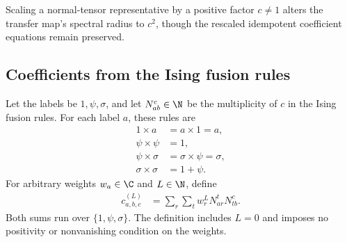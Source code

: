 Scaling a normal-tensor representative by a positive factor $c \ne 1$
alters the transfer map's spectral radius to $c^2$, though the rescaled
idempotent coefficient equations remain preserved.

\subsection{Coefficients from the Ising fusion rules}

\begin{definition}
    \label{def:asymex_ising_coefficients}
    \leanok
    Let the labels be $1,\psi,\sigma$, and let $N_{ab}^{c}\in\N$
    be the multiplicity of $c$ in the Ising fusion rules. For each
    label $a$, these rules are
    \begin{align}
        1\times a          & =a\times 1=a,             \\
        \psi\times\psi     & =1,                       \\
        \psi\times\sigma   & =\sigma\times\psi=\sigma, \\
        \sigma\times\sigma & =1+\psi.
    \end{align}
    For arbitrary weights $w_a\in\C$ and $L\in\N$, define
    \begin{align}
        c_{a,b,c}^{(L)}
         & =\sum_r\sum_t w_r^L N_{ar}^{t}N_{tb}^{c}.
        \label{eq:asymex_ising_coeff}
    \end{align}
    Both sums run over $\{1,\psi,\sigma\}$.
    The definition includes $L=0$ and imposes no positivity or
    nonvanishing condition on the weights.
\end{definition}

